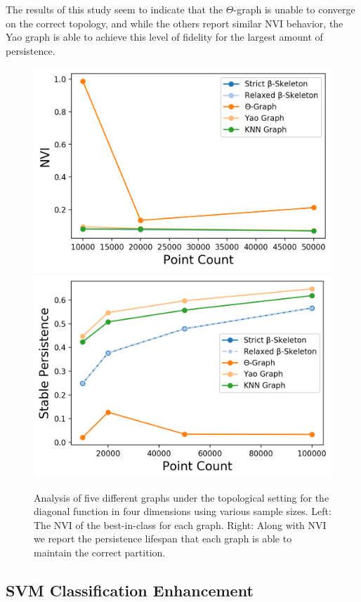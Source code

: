 The results of this study seem to indicate that the $\Theta$-graph is unable to converge on the correct topology, and while the others report similar NVI behavior, the Yao graph is able to achieve this level of fidelity for the largest amount of persistence.

\begin{figure}[htbp]
    \includegraphics[width=0.48\linewidth]{figs/chap7/diagonal_4_nvi.png}
    \includegraphics[width=0.48\linewidth]{figs/chap7/diagonal_4_stability.png}
    \caption{Analysis of five different graphs  under the topological setting for the diagonal function in four dimensions using various sample sizes.
    Left: The NVI of the best-in-class for each graph.
    Right: Along with NVI we report the persistence lifespan that each graph is able to maintain the correct partition.}
    \label{fig:graph_topo}
\end{figure}

\subsection{SVM Classification Enhancement}

